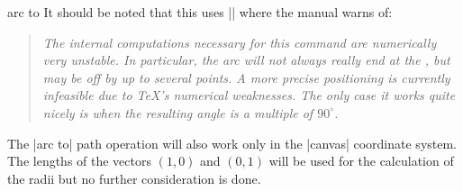 \begin{pathoperation}{arc to}{}
It should be noted that this uses |\pgfpatharcto| where the \tikzname\space manual warns of:
\begin{quote}\itshape
    The internal computations necessary for this command are numerically very unstable.
    In particular, the arc will not always really end at the ,
    but may be off by up to several points.
    A more precise positioning is currently infeasible due to \TeX's numerical weaknesses.
    The only case it works quite nicely is when the resulting angle is a multiple of $90^\circ$. 
\end{quote}

The |arc to| path operation will also work only in the |canvas| coordinate system.
The lengths of the vectors $(1, 0)$ and $(0, 1)$ will be used for the calculation of the radii
but no further consideration is done.
\end{pathoperation}